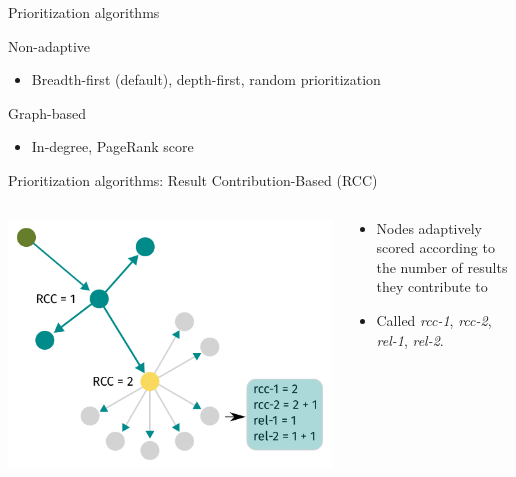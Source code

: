 
\begin{frame}{Prioritization algorithms \parencite{hartig2016walking}}
  \begin{block}{Non-adaptive}
    \begin{itemize}
        \item Breadth-first (default), depth-first, random prioritization
    \end{itemize}
  \end{block}
  \begin{block}{Graph-based}
        \begin{itemize}
        \item In-degree, PageRank score
    \end{itemize}
  \end{block}
\end{frame}

\begin{frame}{Prioritization algorithms: Result Contribution-Based (RCC)}
    \begin{columns}[T] %
        \begin{column}{0.6\textwidth} %
            \includegraphics[width=\linewidth]{images/rcc-based.pdf} %
        \end{column}

        \begin{column}{0.4\textwidth} %
            \begin{itemize}
                \item Nodes adaptively scored according to the number of results they contribute to
                \item Called \emph{rcc-1}, \emph{rcc-2}, \emph{rel-1}, \emph{rel-2}.
            \end{itemize}
        \end{column}
    \end{columns}
\end{frame}

